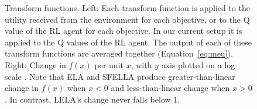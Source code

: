 \begin{figure}[h]
  \caption{Transform functions. Left: Each transform function is applied to the utility received from the environment for each objective, or to the Q value of the RL agent for each objective. In our current setup it is applied to the Q values of the RL agent.
  The output of each of these transform functions are averaged together %
  (Equation~\ref{eq:meu}). Right: Change in $f(x)$ per unit $x$, with $y$ axis plotted on a log scale%
  . Note that ELA and SFELLA produce greater-than-linear change in $f(x)$ when $x<0$ and less-than-linear change when $x>0$. In contrast, LELA's change never falls below 1.}
  \label{fig:transform_functions}
\end{figure}

